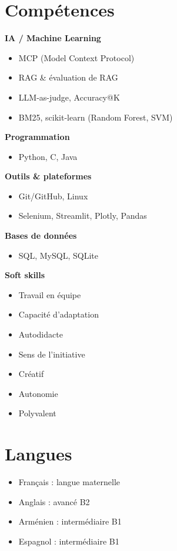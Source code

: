 \documentclass[9.5pt]{article}
\begin{document}
\hfill
\begin{minipage}[t]{0.305\textwidth}

\section*{\large\bfseries\color{accent}Compétences}
\vspace{-2pt}
\small
\textbf{IA / Machine Learning}
\begin{itemize}
  \item MCP (Model Context Protocol)
  \item RAG \& évaluation de RAG
  \item LLM-as-judge, Accuracy@K
  \item BM25, scikit-learn (Random Forest, SVM)
\end{itemize}
\vspace{2pt}
\textbf{Programmation}
\begin{itemize}
  \item Python, C, Java
\end{itemize}
\vspace{2pt}
\textbf{Outils \& plateformes}
\begin{itemize}
  \item Git/GitHub, Linux
  \item Selenium, Streamlit, Plotly, Pandas
\end{itemize}
\vspace{2pt}
\textbf{Bases de données}
\begin{itemize}
  \item SQL, MySQL, SQLite
\end{itemize}
\vspace{2pt}
\textbf{Soft skills}
\begin{itemize}
  \item Travail en équipe
  \item Capacité d'adaptation
  \item Autodidacte
  \item Sens de l'initiative
  \item Créatif
  \item Autonomie
  \item Polyvalent
\end{itemize}

\section*{\large\bfseries\color{accent}Langues}
\vspace{-2pt}
\small
\begin{itemize}
  \item Français : langue maternelle
  \item Anglais : avancé B2
  \item Arménien : intermédiaire B1
  \item Espagnol : intermédiaire B1
\end{itemize}


\end{minipage}
\end{document}
